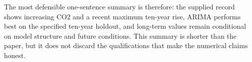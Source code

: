 \documentclass{mcmthesis}
\begin{document}
\begin{appendices}
The most defensible one-sentence summary is therefore: the supplied record shows increasing CO2 and a recent maximum ten-year rise, ARIMA performs best on the specified ten-year holdout, and long-term values remain conditional on model structure and future conditions. This summary is shorter than the paper, but it does not discard the qualifications that make the numerical claims honest.

\end{appendices}
\end{document}
